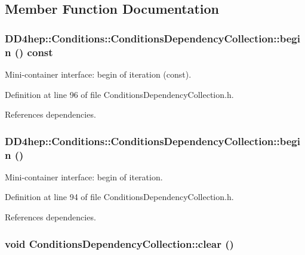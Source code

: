 \subsection{Member Function Documentation}
\hypertarget{class_d_d4hep_1_1_conditions_1_1_conditions_dependency_collection_a3ba4904a588f3c7145ef4be4d91a39ba}{
\subsubsection[{begin}]{ DD4hep::Conditions::ConditionsDependencyCollection::begin () const}}
\label{class_d_d4hep_1_1_conditions_1_1_conditions_dependency_collection_a3ba4904a588f3c7145ef4be4d91a39ba}


Mini-\/container interface: begin of iteration (const). 

Definition at line 96 of file ConditionsDependencyCollection.h.

References dependencies.\hypertarget{class_d_d4hep_1_1_conditions_1_1_conditions_dependency_collection_a975ac1f54aa844d4ae3c3e15f70bfdaa}{
\subsubsection[{begin}]{ DD4hep::Conditions::ConditionsDependencyCollection::begin ()}}
\label{class_d_d4hep_1_1_conditions_1_1_conditions_dependency_collection_a975ac1f54aa844d4ae3c3e15f70bfdaa}


Mini-\/container interface: begin of iteration. 

Definition at line 94 of file ConditionsDependencyCollection.h.

References dependencies.\hypertarget{class_d_d4hep_1_1_conditions_1_1_conditions_dependency_collection_ace3a46d90c1770071d31ae203dadf518}{
\subsubsection[{clear}]{\setlength{\rightskip}{0pt plus 5cm}void ConditionsDependencyCollection::clear ()}}
\label{class_d_d4hep_1_1_conditions_1_1_conditions_dependency_collection_ace3a46d90c1770071d31ae203dadf518}


